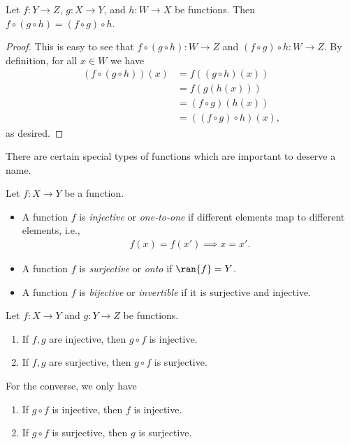 \begin{lemma}
    Let $f : Y \to Z$, $g : X \to Y$, and $h : W \to X$ be functions. Then $f \circ (g \circ h) = (f \circ g) \circ h$.
\end{lemma}

\begin{proof}
    This is easy to see that $f \circ (g \circ h) : W \to Z$ and $(f \circ g) \circ h : W \to Z$. By definition, for all $x \in W$ we have
    \begin{align*}
        (f \circ (g \circ h))(x)
        &= f((g\circ h)(x))\\
        &= f(g(h(x)))\\
        &= (f \circ g)(h(x))\\
        &= ((f \circ g) \circ h)(x),
    \end{align*}
    as desired.
\end{proof}


There are certain special types of functions which are important to deserve a name.

\begin{definition}
    Let $f : X \to Y$ be a function.
    \begin{itemize}
        \item A function $f$ is \emph{injective} or \emph{one-to-one} if different elements map to different elements, i.e.,
            \begin{align*}
                f(x) = f(x') \implies x = x'.
            \end{align*}
        \item A function $f$ is \emph{surjective} or \emph{onto} if $\ran{f} = Y$.
        \item A function $f$ is \emph{bijective} or \emph{invertible} if it is surjective and injective.
    \end{itemize}
\end{definition}

\begin{lemma}\label{lem:properties of injective and surjective}
    Let $f : X \to Y$ and $g : Y \to Z$ be functions.
    \begin{enumerate}
        \item If $f, g$ are injective, then $g \circ f$ is injective.
        \item If $f, g$ are surjective, then $g \circ f$ is surjective.
    \end{enumerate}
    For the converse, we only have
    \begin{enumerate}[resume]
        \item If $g \circ f$ is injective, then $f$ is injective.
        \item If $g \circ f$ is surjective, then $g$ is surjective.
    \end{enumerate}
\end{lemma}

